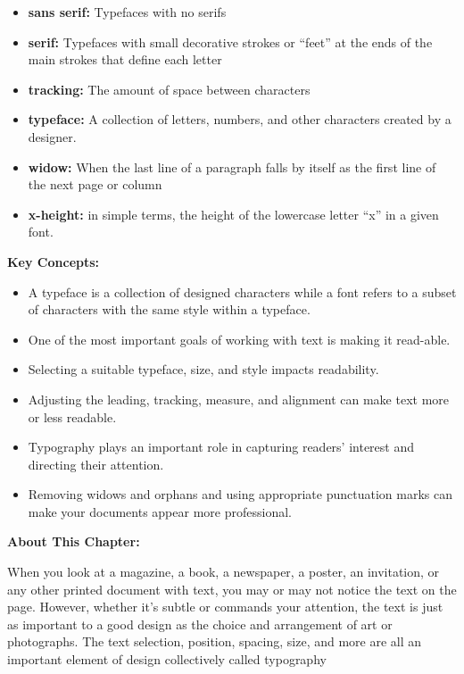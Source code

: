 \documentclass{report}
\begin{document}
\begin{itemize}
      \item \textbf{sans serif:} Typefaces with no serifs
      \item \textbf{serif:} Typefaces with small decorative strokes or “feet” at the ends of the main strokes that define each letter
      \item \textbf{tracking:} The amount of space between characters
      \item \textbf{typeface:} A collection of letters, numbers, and other characters created by a designer.
      \item \textbf{widow:} When the last line of a paragraph falls by itself as the first line of the next page or column
      \item \textbf{x-height:} in simple terms, the height of the lowercase letter “x” in a given font.
    \end{itemize}

    \bigbreak \noindent \bigbreak \noindent 
    \begin{Large}
      \textbf{Key Concepts:}
    \end{Large}
    \bigbreak \noindent 
    \begin{itemize}
      \item A typeface is a collection of designed characters while a font refers to a subset of characters with the same style within a typeface. 
      \item One of the most important goals of working with text is making it read-able. 
      \item Selecting a suitable typeface, size, and style impacts readability.
      \item Adjusting the leading, tracking, measure, and alignment can make text more or less readable. 
      \item Typography plays an important role in capturing readers’ interest and directing their attention. 
      \item Removing widows and orphans and using appropriate punctuation marks can make your documents appear more professional. 
    \end{itemize}

    \bigbreak \noindent \bigbreak \noindent 
    \begin{Large}
      \textbf{About This Chapter:}
    \end{Large}
    \bigbreak \noindent 
    When you look at a magazine, a book, a newspaper, a poster, an invitation, or any other printed document with text, you may or may not notice the text on the page. However, whether it’s subtle or commands your attention, the text is just as important to a good design as the choice and arrangement of art or photographs. The text selection, position, spacing, size, and more are all an important element of design collectively called typography
\end{document}
